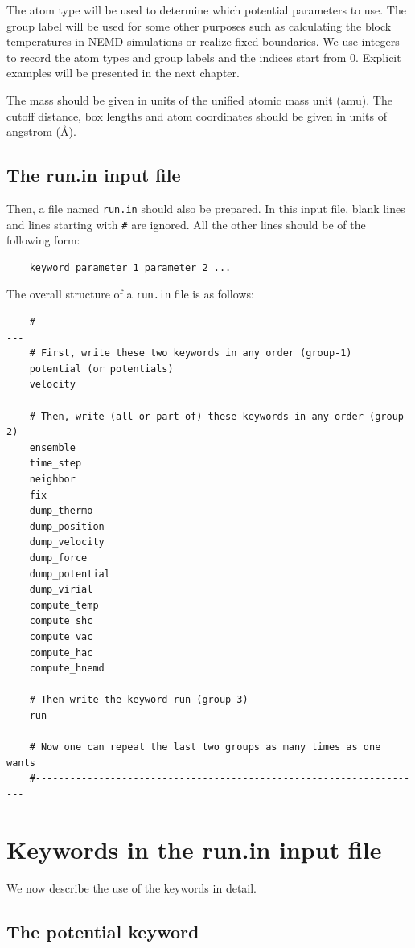 \documentclass[12pt,a4paper]{report}
\begin{document}
The atom type will be used to determine which potential parameters to use. The group label will be used for some other purposes such as calculating the block temperatures in NEMD simulations or realize fixed boundaries. We use integers to record the atom types and group labels and the indices start from 0. Explicit examples will be presented in the next chapter.

The mass should be given in units of the unified atomic mass unit (amu). The cutoff distance, box lengths and atom coordinates should be given in units of angstrom (\AA).


\subsection{The run.in input file}

Then, a file named \verb"run.in" should also be prepared. In this input file, blank lines and lines starting with \verb"#" are ignored. All the other lines should be of the following form:
\begin{verbatim}
    keyword parameter_1 parameter_2 ...
\end{verbatim}
The overall structure of a \verb"run.in" file is as follows:
\begin{verbatim}
    #--------------------------------------------------------------------
    # First, write these two keywords in any order (group-1)
    potential (or potentials)
    velocity

    # Then, write (all or part of) these keywords in any order (group-2)
    ensemble
    time_step
    neighbor
    fix
    dump_thermo
    dump_position
    dump_velocity
    dump_force
    dump_potential
    dump_virial
    compute_temp
    compute_shc
    compute_vac
    compute_hac
    compute_hnemd

    # Then write the keyword run (group-3)
    run

    # Now one can repeat the last two groups as many times as one wants
    #--------------------------------------------------------------------
\end{verbatim}


\section{Keywords in the run.in input file}
We now describe the use of the keywords in detail.

\subsection{The potential keyword}
\end{document}
